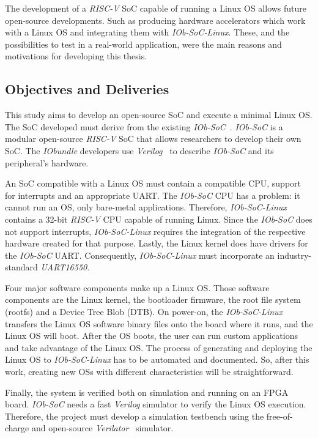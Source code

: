 The development of a \textit{RISC-V} SoC capable of running a Linux OS allows future open-source developments. Such as producing hardware accelerators which work with a Linux OS and integrating them with \textit{IOb-SoC-Linux}. These, and the possibilities to test in a real-world application, were the main reasons and motivations for developing this thesis.

\subsection{Objectives and Deliveries}
This study aims to develop an open-source SoC and execute a minimal Linux OS. The SoC developed must derive from the existing \textit{IOb-SoC}~\cite{iob_soc}. \textit{IOb-SoC} is a modular open-source \textit{RISC-V} SoC that allows researchers to develop their own SoC. The \textit{IObundle} developers use \textit{Verilog}~\cite{thomas2008verilog} to describe \textit{IOb-SoC} and its peripheral's hardware.

An SoC compatible with a Linux OS must contain a compatible CPU, support for interrupts and an appropriate UART. The \textit{IOb-SoC} CPU has a problem: it cannot run an OS, only bare-metal applications. Therefore, \textit{IOb-SoC-Linux} contains a 32-bit \textit{RISC-V} CPU capable of running Linux. Since the \textit{IOb-SoC} does not support interrupts, \textit{IOb-SoC-Linux} requires the integration of the respective hardware created for that purpose. Lastly, the Linux kernel does have drivers for the \textit{IOb-SoC} UART. Consequently, \textit{IOb-SoC-Linux} must incorporate an industry-standard \textit{UART16550}.

Four major software components make up a Linux OS. Those software components are the Linux kernel, the bootloader firmware, the root file system (rootfs) and a Device Tree Blob (DTB). On power-on, the \textit{IOb-SoC-Linux} transfers the Linux OS software binary files onto the board where it runs, and the Linux OS will boot. After the OS boots, the user can run custom applications and take advantage of the Linux OS. The process of generating and deploying the Linux OS to \textit{IOb-SoC-Linux} has to be automated and documented. So, after this work, creating new OSs with different characteristics will be straightforward.

Finally, the system is verified both on simulation and running on an FPGA board. \textit{IOb-SoC} needs a fast \textit{Verilog} simulator to verify the Linux OS execution. Therefore, the project must develop a simulation testbench using the free-of-charge and open-source \textit{Verilator}~\cite{snyder2010verilator} simulator.
